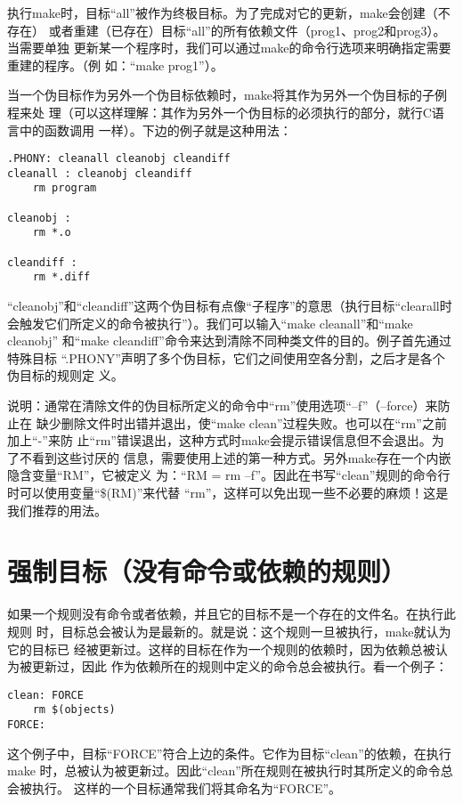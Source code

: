 执行make时，目标“all”被作为终极目标。为了完成对它的更新，make会创建（不存在）
或者重建（已存在）目标“all”的所有依赖文件（prog1、prog2和prog3）。当需要单独
更新某一个程序时，我们可以通过make的命令行选项来明确指定需要重建的程序。（例
如：“make prog1”）。

当一个伪目标作为另外一个伪目标依赖时，make将其作为另外一个伪目标的子例程来处
理（可以这样理解：其作为另外一个伪目标的必须执行的部分，就行C语言中的函数调用
一样）。下边的例子就是这种用法：

\begin{Verbatim}[]
.PHONY: cleanall cleanobj cleandiff
cleanall : cleanobj cleandiff
    rm program

cleanobj :
    rm *.o

cleandiff :
    rm *.diff
\end{Verbatim}

“cleanobj”和“cleandiff”这两个伪目标有点像“子程序”的意思（执行目标“clearall时
会触发它们所定义的命令被执行”）。我们可以输入“make cleanall”和“make cleanobj”
和“make cleandiff”命令来达到清除不同种类文件的目的。例子首先通过特殊目标
“.PHONY”声明了多个伪目标，它们之间使用空各分割，之后才是各个伪目标的规则定
义。

说明：通常在清除文件的伪目标所定义的命令中“rm”使用选项“–f”（--force）来防止在
缺少删除文件时出错并退出，使“make clean”过程失败。也可以在“rm”之前加上“-”来防
止“rm”错误退出，这种方式时make会提示错误信息但不会退出。为了不看到这些讨厌的
信息，需要使用上述的第一种方式。另外make存在一个内嵌隐含变量“RM”，它被定义
为：“RM = rm –f”。因此在书写“clean”规则的命令行时可以使用变量“\$(RM)”来代替
“rm”，这样可以免出现一些不必要的麻烦！这是我们推荐的用法。

\section{强制目标（没有命令或依赖的规则）}
如果一个规则没有命令或者依赖，并且它的目标不是一个存在的文件名。在执行此规则
时，目标总会被认为是最新的。就是说：这个规则一旦被执行，make就认为它的目标已
经被更新过。这样的目标在作为一个规则的依赖时，因为依赖总被认为被更新过，因此
作为依赖所在的规则中定义的命令总会被执行。看一个例子：
\begin{Verbatim}[]
clean: FORCE
    rm $(objects)
FORCE:
\end{Verbatim}

这个例子中，目标“FORCE”符合上边的条件。它作为目标“clean”的依赖，在执行make
时，总被认为被更新过。因此“clean”所在规则在被执行时其所定义的命令总会被执行。
这样的一个目标通常我们将其命名为“FORCE”。


